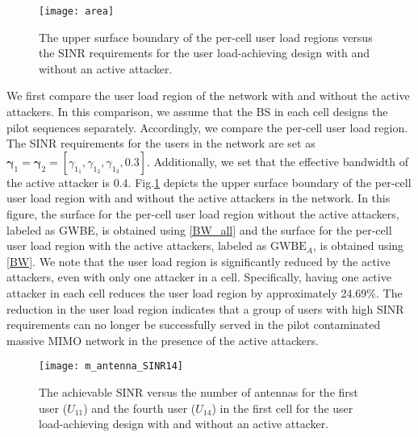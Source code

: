 \documentclass[conference]{IEEEtran}
\begin{document}
\begin{figure}[!t]
\centering
\texttt{[image: area]}
\caption{The upper surface boundary of the per-cell user load regions versus the SINR requirements for the user load-achieving design with and without an active attacker.}
\label{capacity_region}
\end{figure}

We first compare the user load region of the network with and without the active attackers. In this comparison, we assume that the BS in each cell designs the pilot sequences separately. Accordingly, we compare the per-cell user load region. The SINR requirements for the users in the network are set as $\pmb{\gamma}_{1}=\pmb{\gamma}_{2}=\left[\gamma_{1_{1}},\gamma_{1_{2}},\gamma_{1_{3}},0.3\right]$. Additionally, we set that the effective bandwidth of the active attacker is 0.4. Fig.\ref{capacity_region} depicts the upper surface boundary of the per-cell user load region with and without the active attackers in the network. In this figure, the surface for the per-cell user load region without the active attackers, labeled as GWBE, is obtained using \eqref{BW_all} and the surface for the per-cell user load region with the active attackers, labeled as $\textrm{GWBE}_A$, is obtained using \eqref{BW}. We note that the user load region is significantly reduced by the active attackers, even with only one attacker in a cell. Specifically, having one active attacker in each cell reduces the user load region by approximately 24.69\%. The reduction in the user load region indicates that a group of users with high SINR requirements can no longer be successfully served in the pilot contaminated massive MIMO network in the presence of the active attackers.

\begin{figure}[!t]
\centering
\texttt{[image: m\_antenna\_SINR14]}
\caption{The achievable SINR versus the number of antennas for the first user ($U_{11}$) and the fourth user ($U_{14}$) in the first cell for the user load-achieving design with and without an active attacker.}
\label{achievable SINR}
\end{figure}
\end{document}
